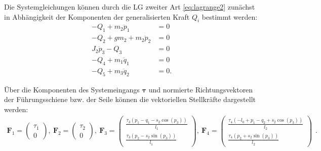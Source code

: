 Die Systemgleichungen können durch die LG zweiter Art \eqref{eq:lagrange2} zunächst in Abhängigkeit der Komponenten der generalisierten Kraft $Q_i$ bestimmt werden:
\begin{subequations}
	\label{eq:double_crane_ODE_w_Q}
	\begin{align}
	- Q_{1} + m_{2} \ddot{p}_{1} &= 0\\
	- Q_{2} + g m_{2} + m_{2} \ddot{p}_{2} &= 0\\
	J_{2} \ddot{p}_{3} - Q_{3} &= 0\\
	- Q_{4} + m_{1} \ddot{q}_{1} &= 0\\
	- Q_{5} + m_{3} \ddot{q}_{2} &= 0.
	\end{align}
\end{subequations}

Über die Komponenten des Systemeingangs $\boldsymbol{\tau}$ und normierte Richtungsvektoren der Führungsschiene bzw. der Seile können die vektoriellen Stellkräfte dargestellt werden:
\begin{equation}
\begin{smallmatrix}
\mathbf{F}_1 =
\left(\begin{matrix}
\tau_{1} \\
0
\end{matrix}\right), \
\mathbf{F}_2 =
\left(\begin{matrix}
\tau_{2} \\
0
\end{matrix}\right), \
\mathbf{F}_3 =
\left(\begin{matrix}
\frac{\tau_{3} \left(p_{1} - q_{1} - s_{2} \cos{\left(p_{3} \right)}\right)}{l_{1}}\\
\frac{\tau_{3} \left(p_{2} - s_{2} \sin{\left(p_{3} \right)}\right)}{l_{1}}
\end{matrix}\right), \
\mathbf{F}_4 =
\left(\begin{matrix}
\frac{\tau_{4} \left(- l_{0} + p_{1} - q_{2} + s_{2} \cos{\left(p_{3} \right)}\right)}{l_{2}}\\
\frac{\tau_{4} \left(p_{2} + s_{2} \sin{\left(p_{3} \right)}\right)}{l_{2}}
\end{matrix}\right)
\end{smallmatrix}.
\end{equation}


